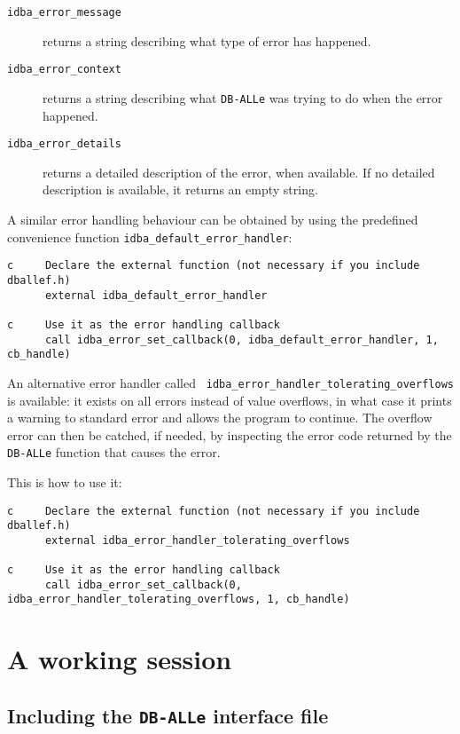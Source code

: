 \documentclass[final,12pt,a4paper,twoside]{book}
\newcommand{\dballe}{{\tt DB-ALLe}}
\begin{document}
\begin{description}
\item[{\tt idba\_error\_message}]
  returns a string describing what type of error has happened.
\item[{\tt idba\_error\_context}]
  returns a string describing what \dballe{} was trying to do when the error
  happened.
\item[{\tt idba\_error\_details}]
  returns a detailed description of the error, when available.  If no detailed
  description is available, it returns an empty string.
\end{description}

A similar error handling behaviour can be obtained by using the predefined
convenience function {\tt idba\_default\_error\_handler}:

\label{fun-error-handler}

\begin{verbatim}
c     Declare the external function (not necessary if you include dballef.h)
      external idba_default_error_handler

c     Use it as the error handling callback
      call idba_error_set_callback(0, idba_default_error_handler, 1, cb_handle)
\end{verbatim}

An alternative error handler called {\tt
idba\_error\_handler\_tolerating\_overflows} is available: it exists on all
errors instead of value overflows, in what case it prints a warning to standard
error and allows the program to continue.  The overflow error can then be
catched, if needed, by inspecting the error code returned by the \dballe{}
function that causes the error.

This is how to use it:

\begin{verbatim}
c     Declare the external function (not necessary if you include dballef.h)
      external idba_error_handler_tolerating_overflows

c     Use it as the error handling callback
      call idba_error_set_callback(0, idba_error_handler_tolerating_overflows, 1, cb_handle)
\end{verbatim}


\chapter {A working session}
\label{ch-work}

\section{Including the \dballe{} interface file}
\end{document}
